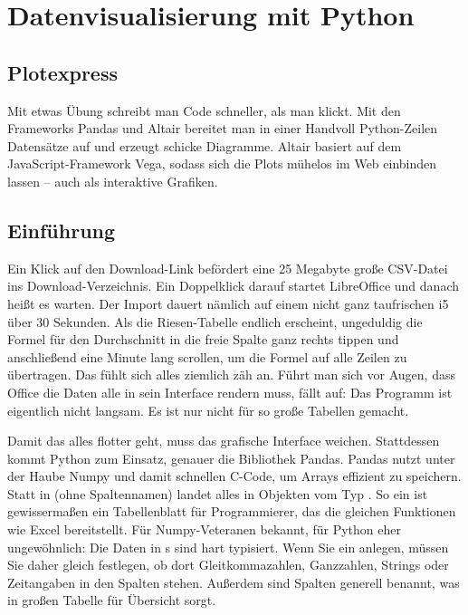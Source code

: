 %
%
%
%




\chapter{Datenvisualisierung mit Python}

\section{Plotexpress}

Mit etwas Übung schreibt man Code schneller, als man klickt. Mit den Frameworks Pandas und Altair bereitet man in einer Handvoll Python-Zeilen Datensätze auf und erzeugt schicke Diagramme. Altair basiert auf dem JavaScript-Framework Vega, sodass sich die Plots mühelos im Web einbinden lassen – auch als interaktive Grafiken.

\section{Einführung}

Ein Klick auf den Download-Link befördert eine 25 Megabyte große CSV-Datei ins Download-Verzeichnis. Ein Doppelklick darauf startet LibreOffice und danach heißt es warten. Der Import dauert nämlich auf einem nicht ganz taufrischen i5 über 30 Sekunden. Als die Riesen-Tabelle endlich erscheint, ungeduldig die Formel für den Durchschnitt in die freie Spalte ganz rechts tippen und anschließend eine Minute lang scrollen, um die Formel auf alle Zeilen zu übertragen. Das fühlt sich alles ziemlich zäh an. Führt man sich vor Augen, dass Office die Daten alle in sein Interface rendern muss, fällt auf: Das Programm ist eigentlich nicht langsam. Es ist nur nicht für so große Tabellen gemacht.

Damit das alles flotter geht, muss das grafische Interface weichen. Stattdessen kommt Python zum Einsatz, genauer die Bibliothek Pandas. Pandas nutzt unter der Haube Numpy und damit schnellen C-Code, um Arrays effizient zu speichern. Statt in  (ohne Spaltennamen) landet alles in Objekten vom Typ . So ein  ist gewissermaßen ein Tabellenblatt für Programmierer, das die gleichen Funktionen wie Excel bereitstellt. Für Numpy-Veteranen bekannt, für Python eher ungewöhnlich: Die Daten in s sind hart typisiert. Wenn Sie ein  anlegen, müssen Sie daher gleich festlegen, ob dort Gleitkommazahlen, Ganzzahlen, Strings oder Zeitangaben in den Spalten stehen. Außerdem sind Spalten generell benannt, was in großen Tabelle für Übersicht sorgt.

